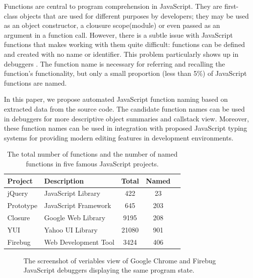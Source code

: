 \documentclass{acm_proc_article-sp}
\begin{document}
Functions are central to program comprehension in JavaScript. They are first-class objects that are used for different purposes by developers; 
they may be used as an object  constructor, a clousure scope(module) or even  passed as an argument in a function call. However, there is a subtle issue with JavaScript functions that makes working with them quite difficult: functions can be defined and created with no name or identifier. This problem particularly shows up in debuggers \cite{Zaytsev}. The function name is necessary for referring and recalling the function's functionality, but only a small proportion (less than 5\%) of JavaScript functions are named.

In this paper, we propose automated JavaScript function naming based on extracted data from the source code. The candidate function names can be used in debuggers for more descriptive object summaries and callstack view. Moreover, these function names can be used in integration with proposed JavaScript typing systems for providing modern editing features in development environments.


\begin{table}
\centering
\caption{The total number of functions and the number of named functions in five famous JavaScript projects.}
  \begin{tabular}{ | l | l | c | c | c |}
  \hline
   Project & Description & Total & Named \\ 
  \hline 
   jQuery & JavaScript Library & 422 & 23 \\ 
  \hline 
   Prototype & JavaScript Framework & 645 & 203 \\ 
  \hline 
   Closure & Google Web Library & 9195 & 208 \\ 
  \hline 
   YUI &  Yahoo UI Library & 21080 & 901 \\ 
  \hline 
   Firebug & Web Development Tool & 3424 & 406 \\ 
  \hline 
  \end{tabular}
 \label{functions} 
\end{table}    


\begin{figure}[htp]
\centerline{
\hfil
{}}
\caption{The screenshot of veriables view of Google Chrome and Firebug JavaScript debuggers displaying the same program state.}
\label{debuggers-objects}
\end{figure}
\end{document}
